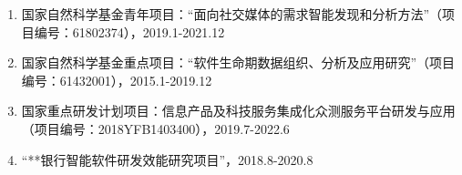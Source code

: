 {
\setlist[enumerate]{}%
\begin{enumerate}[nosep]
    \item 国家自然科学基金青年项目：“面向社交媒体的需求智能发现和分析方法”（项目编号：61802374），2019.1-2021.12
    \item 国家自然科学基金重点项目：“软件生命期数据组织、分析及应用研究”（项目编号：61432001），2015.1-2019.12
    \item 国家重点研发计划项目：信息产品及科技服务集成化众测服务平台研发与应用（项目编号：2018YFB1403400），2019.7-2022.6
    \item “**银行智能软件研发效能研究项目”，2018.8-2020.8
\end{enumerate}
}

\cleardoublepage[plain]%
